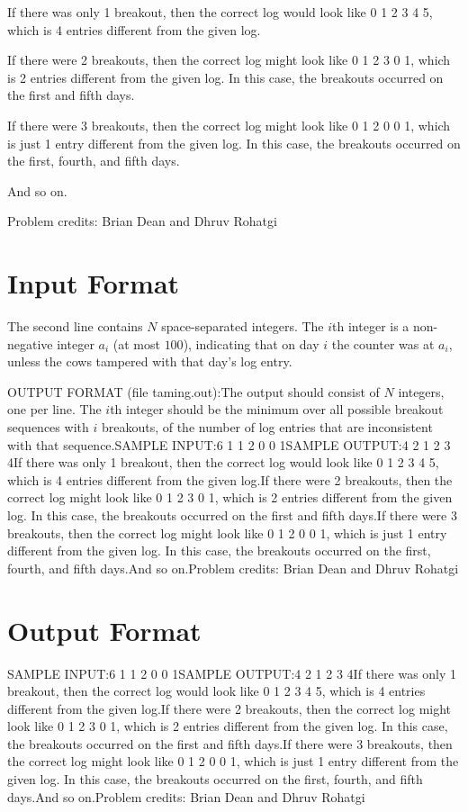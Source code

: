 \documentclass[12pt]{article}
\begin{document}
If there was only 1 breakout, then the correct log would look like 0 1 2 3 4 5,
which is 4 entries different from the given log.

If there were 2 breakouts, then the correct log might look like 0 1 2 3 0 1,
which is 2 entries different from the given log. In this case, the breakouts
occurred on the first and fifth days.

If there were 3 breakouts, then the correct log might look like 0 1 2 0 0 1,
which is just 1 entry different from the given log. In this case, the breakouts
occurred on the first, fourth, and fifth days.

And so on.


Problem credits: Brian Dean and Dhruv Rohatgi



\section*{Input Format}
The second line contains $N$ space-separated integers. The $i$th integer is a
non-negative integer $a_i$ (at most $100$), indicating that on day $i$ the
counter was at $a_i$, unless the cows tampered with that day's log entry.

OUTPUT FORMAT (file taming.out):The output should consist of $N$ integers, one per line. The $i$th
integer should be the minimum over all possible breakout sequences with $i$
breakouts, of the number of log entries that are inconsistent with that
sequence.SAMPLE INPUT:6
1 1 2 0 0 1SAMPLE OUTPUT:4
2
1
2
3
4If there was only 1 breakout, then the correct log would look like 0 1 2 3 4 5,
which is 4 entries different from the given log.If there were 2 breakouts, then the correct log might look like 0 1 2 3 0 1,
which is 2 entries different from the given log. In this case, the breakouts
occurred on the first and fifth days.If there were 3 breakouts, then the correct log might look like 0 1 2 0 0 1,
which is just 1 entry different from the given log. In this case, the breakouts
occurred on the first, fourth, and fifth days.And so on.Problem credits: Brian Dean and Dhruv Rohatgi

\section*{Output Format}
SAMPLE INPUT:6
1 1 2 0 0 1SAMPLE OUTPUT:4
2
1
2
3
4If there was only 1 breakout, then the correct log would look like 0 1 2 3 4 5,
which is 4 entries different from the given log.If there were 2 breakouts, then the correct log might look like 0 1 2 3 0 1,
which is 2 entries different from the given log. In this case, the breakouts
occurred on the first and fifth days.If there were 3 breakouts, then the correct log might look like 0 1 2 0 0 1,
which is just 1 entry different from the given log. In this case, the breakouts
occurred on the first, fourth, and fifth days.And so on.Problem credits: Brian Dean and Dhruv Rohatgi
\end{document}
